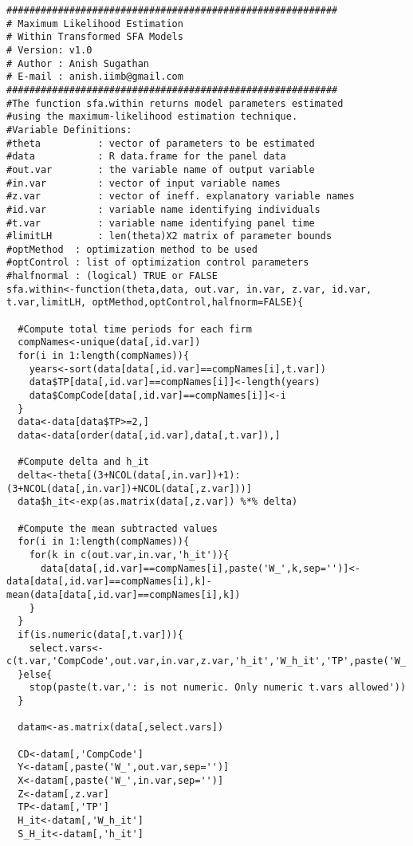 \begin{lstlisting}[label=Rcode1, caption=R-Code for Maximum Likelihood Function]   
##########################################################
# Maximum Likelihood Estimation 
# Within Transformed SFA Models
# Version: v1.0
# Author : Anish Sugathan
# E-mail : anish.iimb@gmail.com 
########################################################## 
#The function sfa.within returns model parameters estimated
#using the maximum-likelihood estimation technique.
#Variable Definitions:
#theta   		: vector of parameters to be estimated
#data    		: R data.frame for the panel data 
#out.var 		: the variable name of output variable
#in.var  		: vector of input variable names
#z.var   		: vector of ineff. explanatory variable names
#id.var  		: variable name identifying individuals
#t.var	 		: variable name identifying panel time
#limitLH 		: len(theta)X2 matrix of parameter bounds
#optMethod	: optimization method to be used
#optControl	: list of optimization control parameters
#halfnormal	: (logical) TRUE or FALSE     
sfa.within<-function(theta,data, out.var, in.var, z.var, id.var, t.var,limitLH, optMethod,optControl,halfnorm=FALSE){
  
  #Compute total time periods for each firm
  compNames<-unique(data[,id.var])
  for(i in 1:length(compNames)){
    years<-sort(data[data[,id.var]==compNames[i],t.var])
    data$TP[data[,id.var]==compNames[i]]<-length(years)  
    data$CompCode[data[,id.var]==compNames[i]]<-i
  }  
  data<-data[data$TP>=2,]
  data<-data[order(data[,id.var],data[,t.var]),]
  
  #Compute delta and h_it
  delta<-theta[(3+NCOL(data[,in.var])+1):(3+NCOL(data[,in.var])+NCOL(data[,z.var]))]
  data$h_it<-exp(as.matrix(data[,z.var]) %*% delta)
  
  #Compute the mean subtracted values  
  for(i in 1:length(compNames)){    
    for(k in c(out.var,in.var,'h_it')){
      data[data[,id.var]==compNames[i],paste('W_',k,sep='')]<-data[data[,id.var]==compNames[i],k]-mean(data[data[,id.var]==compNames[i],k])
    }    
  }
  if(is.numeric(data[,t.var])){
    select.vars<-c(t.var,'CompCode',out.var,in.var,z.var,'h_it','W_h_it','TP',paste('W_',out.var,sep=''),paste('W_',in.var,sep=''))
  }else{
    stop(paste(t.var,': is not numeric. Only numeric t.vars allowed'))
  }
  
  datam<-as.matrix(data[,select.vars])
  
  CD<-datam[,'CompCode']
  Y<-datam[,paste('W_',out.var,sep='')]  
  X<-datam[,paste('W_',in.var,sep='')]
  Z<-datam[,z.var]
  TP<-datam[,'TP']
  H_it<-datam[,'W_h_it']
  S_H_it<-datam[,'h_it']
    

\end{lstlisting}
